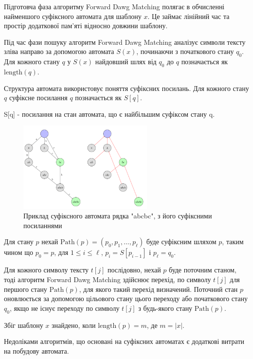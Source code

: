 \documentclass[a4paper,14pt]{extarticle} %
\begin{document}
Підготовча фаза алгоритму Forward Dawg Matching полягає в обчисленні найменшого суфіксного автомата для шаблону \( x \). Це займає лінійний час та простір додаткової пам'яті відносно довжини шаблону.

Під час фази пошуку алгоритм Forward Dawg Matching аналізує символи тексту зліва направо за допомогою автомата \( S(x) \), починаючи з початкового стану \( q_0 \). Для кожного стану \( q \) у \( S(x) \) найдовший шлях від \( q_0 \) до \( q \) позначається як \( \text{length}(q) \).

Структура автомата використовує поняття суфіксних посилань. Для кожного стану \( q \) суфіксне посилання \( q \) позначається як \( S[q] \).

S[q] - посилання на стан автомата, що є найбільшим суфіксом стану q.

\begin{figure}[H]
	\centering
	\includegraphics[width=0.6\textwidth]{images/suffix_automata.png}
	\caption{Приклад суфіксного автомата рядка "abcbc", з його суфіксними посиланнями}
	\label{fig:fdm}
\end{figure}

Для стану \( p \) нехай \( \text{Path}(p) = (p_0, p_1, \ldots, p_{\ell}) \) буде суфіксним шляхом \( p \), таким чином що \( p_0 = p \), для \( 1 \leq i \leq \ell \), \( p_i = S[p_{i-1}] \) і \( p_{\ell} = q_0 \).

Для кожного символу тексту \( t[j] \) послідовно, нехай \( p \) буде поточним станом, тоді алгоритм Forward Dawg Matching здійснює перехід, по символу \( t[j] \) для першого стану \( \text{Path}(p) \), для якого такий перехід визначений. Поточний стан \( p \) оновлюється за допомогою цільового стану цього переходу або початкового стану \( q_0 \), якщо не існує переходу по символу \( t[j] \) з будь-якого стану \( \text{Path}(p) \).

Збіг шаблону \( x \) знайдено, коли \( \text{length}(p) = m \), де $m =|x|$.

Недоліками алгоритмів, що основані на суфіксних автоматах є додаткові витрати на побудову автомата.
\end{document}
